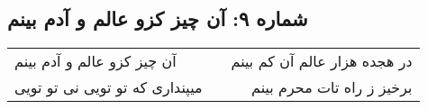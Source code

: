 \begin{center}
\section*{شماره ۹: آن چیز کزو عالم و آدم بینم}
\label{sec:009}
\begin{longtable}{l p{0.5cm} r}
آن چیز کزو عالم و آدم بینم
&&
در هجده هزار عالم آن کم بینم
\\
میپنداری که تو تویی نی تو تویی
&&
برخیز ز راه تات محرم بینم
\\
\end{longtable}
\end{center}
